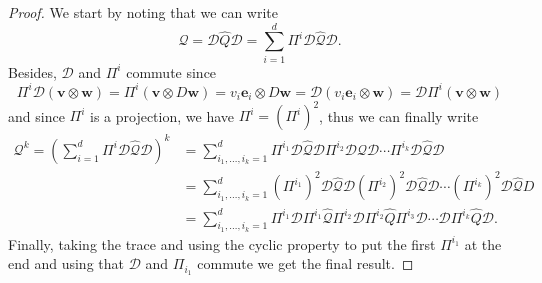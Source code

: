 \documentclass[letterpaper, 10pt, dvipsnames]{article}
\numberwithin{equation}{section}
\newcommand{\D}{\mathcal{D}}
\newcommand{\Q}{\mathcal{Q}}
\newcommand{\ebf}{\mathbf{e}}
\renewcommand{\v}{\mathbf{v}}
\newcommand{\w}{\mathbf{w}}
\theoremstyle{definition}
\begin{document}
\begin{proof}
  We start by noting that we can write  
  \[
  \Q = \D\widehat{Q}\D = \sum_{i=1}^d \Pi^i \D\widehat{\Q}\D.
  \]
  Besides, $\D$ and $\Pi^i$ commute since
  \[
  \Pi^i\D (\v\otimes \w) = \Pi^i(\v\otimes D\w) = v_i\ebf_i\otimes D\w = \D (v_i\ebf_i\otimes \w) = \D\Pi^i(\v\otimes \w)
  \]
  and since $\Pi^i$ is a projection, we have $\Pi^i = (\Pi^i)^2$, thus we can finally write 
  \begin{align*}
  \Q^ k = \left(\sum_{i=1}^d \Pi^i\D\widehat{\Q}\D \right)^k
  &=
  \sum_{i_1,\dots,i_k=1}^d
  \Pi^{i_1}\D\widehat{\Q}\D \Pi^{i_2}\D\widehat{\Q}\D \cdots \Pi^{i_k}\D\widehat{\Q}\D\\
  & = 
  \sum_{i_1,\dots,i_k=1}^d 
  (\Pi^{i_1})^2 \D\widehat{\Q}\D(\Pi^{i_2})^2\D\widehat{\Q}\D \cdots (\Pi^{i_k})^2\D\widehat{\Q}D\\
  & =
  \sum_{i_1,\dots,i_k=1}^d \Pi^{i_1}\D\Pi^{i_1}\widehat{\Q}\Pi^{i_2}\D\Pi^{i_2}\widehat{Q}\Pi^{i_3}\D \cdots \D\Pi^{i_k}\widehat{Q}\D.
  \end{align*}
  Finally, taking the trace and using the cyclic property to put the first $\Pi^{i_1}$ at the end and using that $\D$ and $\Pi_{i_1}$ commute we get the final result.  
\end{proof}
\end{document}
